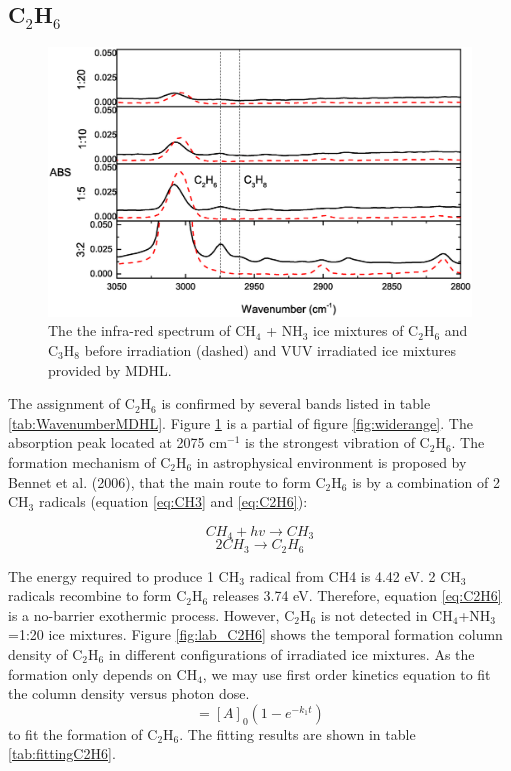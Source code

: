 \subsection{C$_2$H$_6$}

\begin{figure}
\centering
\includegraphics[width=\textwidth]{figures/chapter3/C2H6.eps}
\caption{The the infra-red spectrum of CH$_4$ + NH$_3$ ice mixtures of C$_2$H$_6$ and C$_3$H$_8$ before irradiation (dashed) and VUV irradiated ice mixtures provided by MDHL. }
\label{fig:C2H6}
\end{figure}

The assignment of C$_2$H$_6$ is confirmed by several bands listed in table \ref{tab:WavenumberMDHL}. Figure \ref{fig:C2H6} is a partial of figure \ref{fig:widerange}. The absorption peak located at 2075 cm$^{-1}$ is the strongest vibration of C$_2$H$_6$. The formation mechanism of C$_2$H$_6$ in astrophysical environment is proposed by Bennet et al. (2006), that the main route to form C$_2$H$_6$ is by a combination of 2 CH$_3$ radicals (equation \ref{eq:CH3} and \ref{eq:C2H6}):

\begin{equation}
CH_4 + hv \rightarrow CH_3
\label{eq:CH3}
\end{equation}
\begin{equation}
2 CH_3 \rightarrow C_2H_6
\label{eq:C2H6}
\end{equation}

The energy required to produce 1 CH$_3$ radical from CH4 is 4.42 eV. 2 CH$_3$ radicals recombine to form C$_2$H$_6$ releases 3.74 eV. Therefore, equation \ref{eq:C2H6} is a no-barrier exothermic process. However, C$_2$H$_6$ is not detected in CH$_4$+NH$_3$=1:20 ice mixtures. Figure \ref{fig:lab_C2H6} shows the temporal formation column density of C$_2$H$_6$ in different configurations of irradiated ice mixtures.  As the formation only depends on CH$_4$, we may use first order kinetics equation to fit the column density versus photon dose.
\begin{equation}
[A] = [A]_0(1 - e^{-k_1 t})
\label{eq:1step}
\end{equation}
to fit the formation of C$_2$H$_6$. The fitting results are shown in table \ref{tab:fittingC2H6}.

